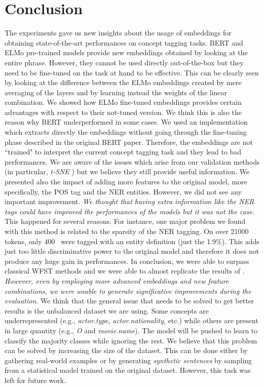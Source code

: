 \documentclass[11pt,a4paper]{article}
\begin{document}
\section{Conclusion}
The experiments gave us new insights about the usage of embeddings for obtaining state-of-the-art performances on concept tagging tasks. BERT and ELMo pre-trained models provide new embeddings obtained by looking at the entire phrase. However, they cannot be used directly out-of-the-box but they need to be fine-tuned on the task at hand to be effective. This can be clearly seen by looking at the difference between the ELMo embeddings created by mere averaging of the layers and by learning instead the weights of the linear combination. We showed how ELMo fine-tuned embeddings provides certain advantages with respect to their not-tuned version. We think this is also the reason why BERT underperformed in some cases. We used an implementation which extracts directly the embeddings without going through the fine-tuning phase described in the original BERT paper. Therefore, the embeddings are not ``trained" to interpret the current concept tagging task and they lead to bad performances. We are aware of the issues which arise from our validation methods (in particular, \textit{t-SNE} \cite{wattenberg2016how}) but we believe they still provide useful information.
We presented also the impact of adding more features to the original model, more specifically, the POS tag and the NER entities. However, we did not see any important improvement. \textit{We thought that having extra information like the NER tags could have improved the performances of the models but it was not the case}. This happened for several reasons. For instance, one major problem we found with this method is related to the sparsity of the NER tagging. On over 21000 tokens, only 400~ were tagged with an entity definition (just the 1.9\%). This adds just too little discriminative power to the original model and therefore it does not produce any huge gain in performances.
In conclusion, we were able to surpass classical WFST methods and we were able to almost replicate the results of \citet{gobbi}. \textit{However, even by employing more advanced embeddings and new feature combinations, we were unable to generate significative improvements during the evaluation}.  
We think that the general issue that needs to be solved to get better results is the unbalanced dataset we are using. Some concepts are underrepresented (e.g., \textit{actor.type}, \textit{actor.nationality}, etc.) while others are present in large quantity (e.g., \textit{O} and \textit{movie.name}). The model will be pushed to learn to classify the majority classes while ignoring the rest. We believe that this problem can be solved by increasing the size of the dataset. This can be done either by gathering real-world examples or by generating \textit{synthetic sentences} by sampling from a statistical model trained on the original dataset. However, this task was left for future work.



\end{document}
